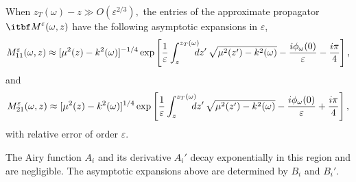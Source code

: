 \documentclass[final]{siamltex}
\begin{document}
\vspace{0.05in}
\begin{lemma} 
\label{lem.3}
When $z_T({\omega}) - z \gg O({\varepsilon}^{2/3}),$ the entries
of the approximate propagator ${{\itbf M}}^{\varepsilon}({\omega},z)$ have the following
asymptotic expansions in ${\varepsilon}$,
\begin{equation*}
M_{11}^{\varepsilon}({\omega},z) \approx [\mu^2(z)-k^2({\omega})]^{-1/4} \exp \left[
  \frac{1}{\varepsilon} \int_z^{z_T({\omega})} \hspace{-0.1in} d z' \,
  \sqrt{\mu^2(z')-k^2({\omega})} - \frac{i \phi_{\omega}(0)}{\varepsilon} - \frac{i
    \pi}{4} \right],
\end{equation*}
and 
\begin{equation*}
M_{21}^{\varepsilon}({\omega},z) \approx [\mu^2(z)-k^2({\omega})]^{1/4} \exp \left[
  \frac{1}{\varepsilon} \int_z^{z_T({\omega})} \hspace{-0.1in} d z' \,
  \sqrt{\mu^2(z')-k^2({\omega})} - \frac{i \phi_{\omega}(0)}{\varepsilon} + \frac{i
    \pi}{4} \right],
\end{equation*}
with relative error of order ${\varepsilon}$. 
\end{lemma}

\vspace{0.05in} \noindent The Airy function $A_i$ and its derivative $A_i'$
decay exponentially in this region and are negligible. The asymptotic expansions above are determined by
$B_i$ and $B_i'$.
\end{document}
